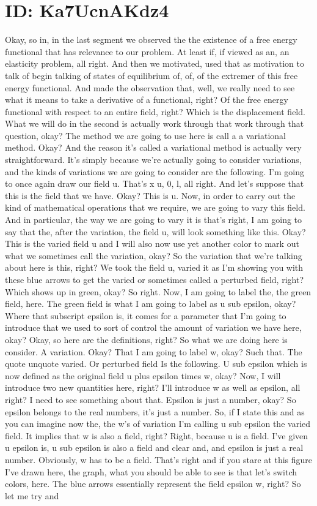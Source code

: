 \documentclass[10pt]{article}
\begin{document}
{\section*{ID: Ka7UcnAKdz4}
Okay, so in, in the last segment we observed the the existence of a free energy functional that has relevance to our problem. At least if, if viewed as an, an elasticity problem, all right. And then we motivated, used that as motivation to talk of begin talking of states of equilibrium of, of, of the extremer of this free energy functional. And made the observation that, well, we really need to see what it means to take a derivative of a functional, right? Of the free energy functional with respect to an entire field, right? Which is the displacement field. What we will do in the second is actually work through that work through that question, okay? The method we are going to use here is call a a variational method. Okay? And the reason it's called a variational method is actually very straightforward. It's simply because we're actually going to consider variations, and the kinds of variations we are going to consider are the following. I'm going to once again draw our field u. That's x u, 0, l, all right. And let's suppose that this is the field that we have. Okay? This is u. Now, in order to carry out the kind of mathematical operations that we require, we are going to vary this field. And in particular, the way we are going to vary it is that's right, I am going to say that the, after the variation, the field u, will look something like this. Okay? This is the varied field u and I will also now use yet another color to mark out what we sometimes call the variation, okay? So the variation that we're talking about here is this, right? We took the field u, varied it as I'm showing you with these blue arrows to get the varied or sometimes called a perturbed field, right? Which shows up in green, okay? So right. Now, I am going to label the, the green field, here. The green field is what I am going to label as u sub epsilon, okay? Where that subscript epsilon is, it comes for a parameter that I'm going to introduce that we used to sort of control the amount of variation we have here, okay? Okay, so here are the definitions, right?  So what we are doing here is consider. A variation. Okay? That I am going to label w, okay? Such that. The quote unquote varied. Or perturbed field Is the following. U sub epsilon which is now defined as the original field u plus epsilon times w, okay? Now, I will introduce two new quantities here, right? I'll introduce w as well as epsilon, all right? I need to see something about that. Epsilon is just a number, okay? So epsilon belongs to the real numbers, it's just a number. So, if I state this and as you can imagine now the, the w's of variation I'm calling u sub epsilon the varied field. It implies that w is also a field, right? Right, because u is a field. I've given u epsilon is, u sub epsilon is also a field and clear and, and epsilon is just a real number. Obviously, w has to be a field. That's right and if you stare at this figure I've drawn here, the graph, what you should be able to see is that let's switch colors, here. The blue arrows essentially represent the field epsilon w, right? So let me try and }
\end{document}
